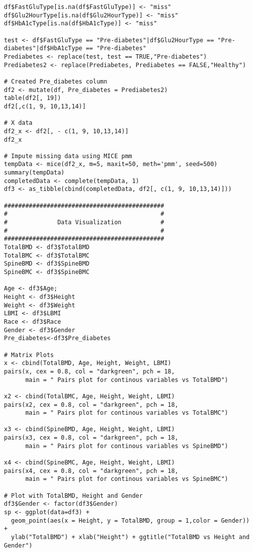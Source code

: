 \documentclass[11pt]{article}
\begin{document}
\begin{verbatim}
df$FastGluType[is.na(df$FastGluType)] <- "miss"
df$Glu2HourType[is.na(df$Glu2HourType)] <- "miss"
df$HbA1cType[is.na(df$HbA1cType)] <- "miss"

test <- df$FastGluType == "Pre-diabetes"|df$Glu2HourType == "Pre-diabetes"|df$HbA1cType == "Pre-diabetes"
Prediabetes <- replace(test, test == TRUE,"Pre-diabetes")
Prediabetes2 <- replace(Prediabetes, Prediabetes == FALSE,"Healthy")

# Created Pre_diabetes column
df2 <- mutate(df, Pre_diabetes = Prediabetes2)
table(df2[, 19])
df2[,c(1, 9, 10,13,14)]

# X data
df2_x <- df2[, - c(1, 9, 10,13,14)]
df2_x

# Impute missing data using MICE pmm
tempData <- mice(df2_x, m=5, maxit=50, meth='pmm', seed=500)
summary(tempData) 
completedData <- complete(tempData, 1)
df3 <- as_tibble(cbind(completedData, df2[, c(1, 9, 10,13,14)]))

#############################################
#                                           #
#              Data Visualization           #
#                                           #
#############################################
TotalBMD <- df3$TotalBMD
TotalBMC <- df3$TotalBMC
SpineBMD <- df3$SpineBMD
SpineBMC <- df3$SpineBMC

Age <- df3$Age;
Height <- df3$Height
Weight <- df3$Weight
LBMI <- df3$LBMI
Race <- df3$Race
Gender <- df3$Gender
Pre_diabetes<-df3$Pre_diabetes

# Matrix Plots
x <- cbind(TotalBMD, Age, Height, Weight, LBMI) 
pairs(x, cex = 0.8, col = "darkgreen", pch = 18, 
      main = " Pairs plot for continous variables vs TotalBMD")

x2 <- cbind(TotalBMC, Age, Height, Weight, LBMI) 
pairs(x2, cex = 0.8, col = "darkgreen", pch = 18, 
      main = " Pairs plot for continous variables vs TotalBMC")

x3 <- cbind(SpineBMD, Age, Height, Weight, LBMI) 
pairs(x3, cex = 0.8, col = "darkgreen", pch = 18, 
      main = " Pairs plot for continous variables vs SpineBMD")

x4 <- cbind(SpineBMC, Age, Height, Weight, LBMI) 
pairs(x4, cex = 0.8, col = "darkgreen", pch = 18, 
      main = " Pairs plot for continous variables vs SpineBMC")

# Plot with TotalBMD, Height and Gender
df3$Gender <- factor(df3$Gender)   
sp <- ggplot(data=df3) +
  geom_point(aes(x = Height, y = TotalBMD, group = 1,color = Gender)) +
  ylab("TotalBMD") + xlab("Height") + ggtitle("TotalBMD vs Height and Gender")


\end{verbatim}
\end{document}
